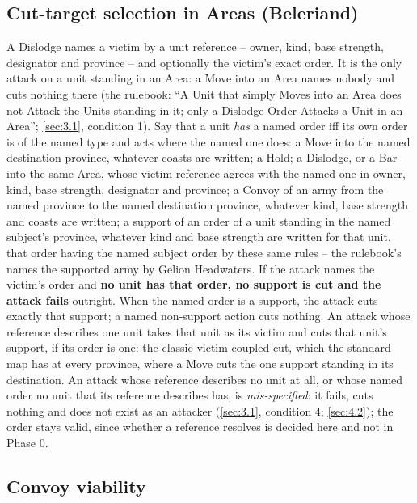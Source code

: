\documentclass[12pt,a4paper]{article}
\begin{document}
\subsection{Cut-target selection in Areas (Beleriand)}\label{sec:3.4}

A Dislodge names a victim by a unit reference -- owner, kind, base strength, designator and province -- and optionally the victim's exact order.
It is the only attack on a unit standing in an Area: a Move into an Area names nobody and cuts nothing there (the rulebook: ``A Unit that simply Moves into an Area does not Attack the Units standing in it; only a Dislodge Order Attacks a Unit in an Area''; \cref{sec:3.1}, condition 1).
Say that a unit \emph{has} a named order iff its own order is of the named type and acts where the named one does: a Move into the named destination province, whatever coasts are written; a Hold; a Dislodge, or a Bar into the same Area, whose victim reference agrees with the named one in owner, kind, base strength, designator and province; a Convoy of an army from the named province to the named destination province, whatever kind, base strength and coasts are written; a support of an order of a unit standing in the named subject's province, whatever kind and base strength are written for that unit, that order having the named subject order by these same rules -- the rulebook's  names the supported army by Gelion Headwaters.
If the attack names the victim's order and \textbf{no unit has that order, no support is cut and the attack fails} outright.
When the named order is a support, the attack cuts exactly that support; a named non-support action cuts nothing.
An attack whose reference describes one unit takes that unit as its victim and cuts that unit's support, if its order is one: the classic victim-coupled cut, which the standard map has at every province, where a Move cuts the one support standing in its destination.
An attack whose reference describes no unit at all, or whose named order no unit that its reference describes has, is \emph{mis-specified}: it fails, cuts nothing and does not exist as an attacker (\cref{sec:3.1}, condition 4; \cref{sec:4.2}); the order stays valid, since whether a reference resolves is decided here and not in Phase 0.

\subsection{Convoy viability}\label{sec:3.5}
\end{document}

